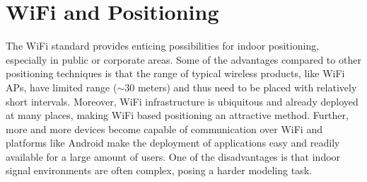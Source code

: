 \documentclass{LTHthesis}
\begin{document}
\section{WiFi and Positioning}
\label{sec:wifi_positioning}
%
The WiFi standard provides enticing possibilities for indoor positioning, especially in public or corporate areas. Some of the advantages compared to other positioning techniques is that the range of typical wireless products, like WiFi APs, have limited range ($\sim 30$ meters) and thus need to be placed with relatively short intervals. Moreover, WiFi infrastructure is ubiquitous and already deployed at many places, making WiFi based positioning an attractive method. Further, more and more devices become capable of communication over WiFi and platforms like Android make the deployment of applications easy and readily available for a large amount of users. One of the disadvantages is that indoor signal environments are often complex, posing a harder modeling task.
\end{document}
